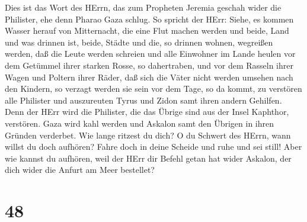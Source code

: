  Dies ist das Wort des HErrn, das zum Propheten Jeremia
geschah wider die Philister, ehe denn Pharao Gaza schlug. 
So spricht der HErr: Siehe, es kommen Wasser herauf von Mitternacht, die
eine Flut machen werden und beide, Land und was drinnen ist, beide,
Städte und die, so drinnen wohnen, wegreißen werden, daß die Leute
werden schreien und alle Einwohner im Lande heulen  vor dem
Getümmel ihrer starken Rosse, so dahertraben, und vor dem Rasseln ihrer
Wagen und Poltern ihrer Räder, daß sich die Väter nicht werden umsehen
nach den Kindern, so verzagt werden sie sein  vor dem Tage,
so da kommt, zu verstören alle Philister und auszureuten Tyrus und Zidon
samt ihren andern Gehilfen. Denn der HErr wird die Philister, die das
Übrige sind aus der Insel Kaphthor, verstören.  Gaza wird
kahl werden und Askalon samt den Übrigen in ihren Gründen verderbet. Wie
lange ritzest du dich?  O du Schwert des HErrn, wann willst
du doch aufhören? Fahre doch in deine Scheide und ruhe und sei still!
 Aber wie kannst du aufhören, weil der HErr dir Befehl getan
hat wider Askalon, der dich wider die Anfurt am Meer bestellet?

\hypertarget{section-47}{%
\section{48}\label{section-47}}

